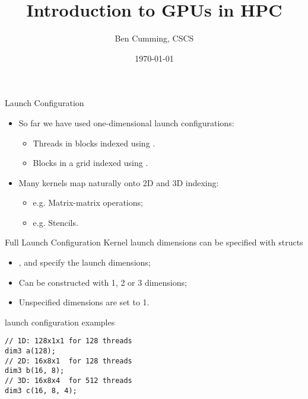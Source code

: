\documentclass[aspectratio=43]{beamer}
\author{Ben Cumming, CSCS}
\title{Introduction to GPUs in HPC}
\subtitle{}
\date{\today}
\begin{document}
\cscstitle


\begin{frame}[fragile]{Launch Configuration}
       \begin{itemize}
           \item So far we have used one-dimensional launch configurations:
           \begin{itemize}
               \item Threads in blocks indexed using .
               \item Blocks in a grid indexed using .
           \end{itemize}
           \item Many kernels map naturally onto 2D and 3D indexing:
           \begin{itemize}
               \item e.g. Matrix-matrix operations;
               \item e.g. Stencils.
           \end{itemize}
       \end{itemize}

\end{frame}

\begin{frame}[fragile]{Full Launch Configuration}
        Kernel launch dimensions can be specified with  structs
        \begin{center}
        \end{center}
       \begin{itemize}
           \item {},  and  specify the launch dimensions;
           \item Can be constructed with 1, 2 or 3 dimensions;
           \item Unspecified  dimensions are set to 1.
       \end{itemize}

   \begin{code}{launch configuration examples}
        \begin{lstlisting}[style=boxcudatiny]
// 1D: 128x1x1 for 128 threads
dim3 a(128);
// 2D: 16x8x1  for 128 threads
dim3 b(16, 8);
// 3D: 16x8x4  for 512 threads
dim3 c(16, 8, 4);
        \end{lstlisting}
   \end{code}

\end{frame}
\end{document}
